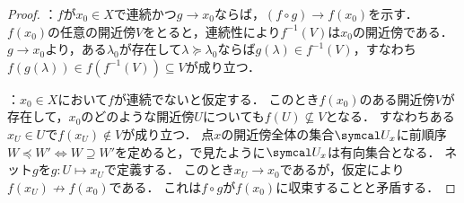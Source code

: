 \documentclass{ltjsbook}
\begin{document}
\begin{proof}
：\(f\)が\(x_0 \in X\)で連続かつ\(g \to x_0\)ならば，\((f \circ g) \to f (x_0)\)を示す．
\(f(x_0)\)の任意の開近傍\(V\)をとると，連続性により\(f^{-1}(V)\)は\(x_0\)の開近傍である．
\(g \to x_0\)より，ある\(\lambda_0\)が存在して\(\lambda \succeq \lambda_0\)ならば\(g(\lambda) \in f^{-1}(V)\)，すなわち\(f(g(\lambda)) \in f(f^{-1}(V)) \subseteq V\)が成り立つ．

：\(x_0 \in X\)において\(f\)が連続でないと仮定する．
このとき\(f(x_0)\)のある開近傍\(V\)が存在して，\(x_0\)のどのような開近傍\(U\)についても\(f(U) \not \subseteq V\)となる．
すなわちある\(x_U \in U\)で\(f(x_U) \not\in V\)が成り立つ．
点\(x\)の開近傍全体の集合\(\OpenNeighborhood{x}\)に前順序\(W \preceq W' \Leftrightarrow W \supseteq W'\)を定めると，で見たように\(\OpenNeighborhood{x}\)は有向集合となる．
ネット\(g\)を\(g \colon U \mapsto x_U\)で定義する．
このとき\(x_U \to x_0\)であるが，仮定により\(f(x_U) \not\to f(x_0)\)である．
これは\(f \circ g\)が\(f(x_0)\)に収束することと矛盾する．
\end{proof}
\end{document}
